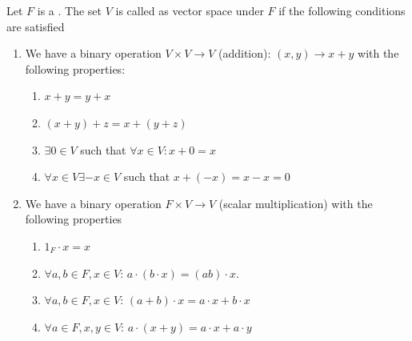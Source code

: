 \begin{appendices}
\begin{definition}
  \label{def:vectorspace}
  Let $F$ is a . The set $V$ is called as vector
  space under $F$ if the following conditions are satisfied
  \begin{enumerate}
  \item We have a binary operation $V \times V \rightarrow V$
    (addition): $(x,y) \rightarrow x + y$ with the following
    properties:
    \begin{enumerate}
    \item $x + y = y + x$
    \item $(x + y) + z = x + ( y + z )$
    \item $\exists 0 \in V$ such that $\forall x \in V: x + 0 = x$
    \item $\forall x \in V \exists -x \in V$ such that $x + (-x) = x -
      x = 0$ 
    \end{enumerate}    
  \item We have a binary operation $F \times V \rightarrow V$ (scalar
    multiplication) with the following properties
    \begin{enumerate}
    \item $1_F \cdot x = x$
    \item $\forall a,b \in F, x \in V$: $a\cdot\left(b \cdot x\right)
      = \left(a b\right) \cdot x$.
    \item $\forall a,b \in F, x \in V$:
      $(a+b)\cdot x = a \cdot x + b \cdot x$
    \item $\forall a \in F, x, y \in V$:
      $a\cdot(x+y) = a\cdot x + a \cdot y$
    \end{enumerate}        
  \end{enumerate}
\end{definition}


\end{appendices}
